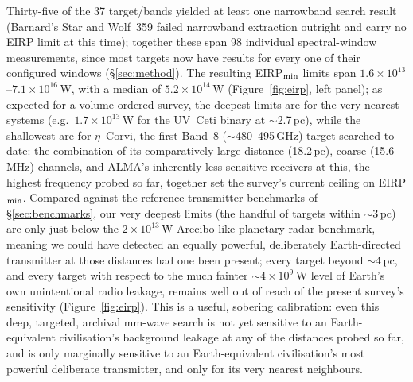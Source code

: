 \documentclass{openjournal}
\begin{document}
Thirty-five of the 37 target/bands yielded at least one narrowband search
result (Barnard's Star and Wolf~359 failed narrowband extraction
outright and carry no EIRP limit at this time); together these span 98
individual spectral-window measurements, since most targets now have
results for every one of their configured windows (\S\ref{sec:method}).
The resulting EIRP$_{\rm min}$ limits span
$1.6\times10^{13}$--$7.1\times10^{16}$\,W, with a median of
$5.2\times10^{14}$\,W (Figure~\ref{fig:eirp}, left panel); as expected
for a volume-ordered survey, the deepest limits are for the very nearest
systems (e.g.\ $1.7\times10^{13}$\,W for the UV~Ceti binary at $\sim$2.7\,pc),
while the shallowest are for $\eta$~Corvi, the first Band~8 ($\sim$480--495\,GHz)
target searched to date: the combination of its comparatively large
distance (18.2\,pc), coarse (15.6\,MHz) channels, and ALMA's inherently
less sensitive receivers at this, the highest frequency probed so far,
together set the survey's current ceiling on EIRP$_{\rm min}$.
Compared against the reference transmitter benchmarks of
\S\ref{sec:benchmarks}, our very deepest limits (the handful of targets
within $\sim$3\,pc) are only just below the $2\times10^{13}$\,W
Arecibo-like planetary-radar benchmark, meaning we could have detected an
equally powerful, deliberately Earth-directed transmitter at those
distances had one been present; every target beyond $\sim$4\,pc, and
every target with respect to the much fainter $\sim4\times10^{9}$\,W
level of Earth's own unintentional radio leakage, remains well out of
reach of the present survey's sensitivity (Figure~\ref{fig:eirp}). This
is a useful, sobering calibration: even this deep, targeted, archival
mm-wave search is not yet sensitive to an Earth-equivalent civilisation's
background leakage at any of the distances probed so far, and is only
marginally sensitive to an Earth-equivalent civilisation's most powerful
deliberate transmitter, and only for its very nearest neighbours.
\end{document}
